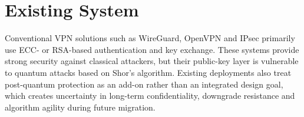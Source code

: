 \section{Existing System}
Conventional VPN solutions such as WireGuard, OpenVPN and IPsec primarily use
ECC- or RSA-based authentication and key exchange. These systems provide strong
security against classical attackers, but their public-key layer is vulnerable
to quantum attacks based on Shor's algorithm. Existing deployments also treat
post-quantum protection as an add-on rather than an integrated design goal,
which creates uncertainty in long-term confidentiality, downgrade resistance
and algorithm agility during future migration.
